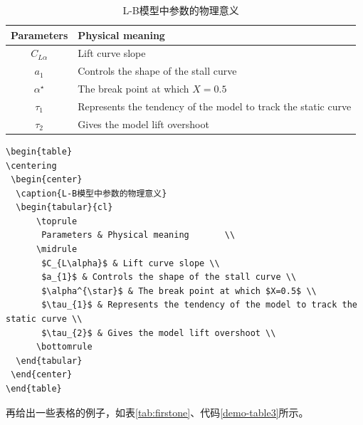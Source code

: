 \begin{table}              %
\centering
 \begin{center}
  \caption{L-B模型中参数的物理意义}
  \label{tab:LB-parameters}
  \begin{tabular}{cl}
      \toprule
       Parameters & Physical meaning       \\
      \midrule   %
       $C_{L\alpha}$ & Lift curve slope \\
       $a_{1}$ & Controls the shape of the stall curve \\
       $\alpha^{\star}$ & The break point at which $X=0.5$ \\
       $\tau_{1}$ & Represents the tendency of the model to track the static curve \\
       $\tau_{2}$ & Gives the model lift overshoot \\
      \bottomrule
  \end{tabular}
 \end{center}
\end{table}

\begin{lstlisting}[language={[LaTeX]TeX}, caption={插入表格\ref{tab:LB-parameters}}, label=demo-table2]
\begin{table}
\centering
 \begin{center}
  \caption{L-B模型中参数的物理意义}
  \begin{tabular}{cl}
      \toprule
       Parameters & Physical meaning       \\
      \midrule 
       $C_{L\alpha}$ & Lift curve slope \\
       $a_{1}$ & Controls the shape of the stall curve \\
       $\alpha^{\star}$ & The break point at which $X=0.5$ \\
       $\tau_{1}$ & Represents the tendency of the model to track the static curve \\
       $\tau_{2}$ & Gives the model lift overshoot \\
      \bottomrule
  \end{tabular}
 \end{center}
\end{table}
\end{lstlisting}

再给出一些表格的例子，如表\ref{tab:firstone}、代码\ref{demo-table3}所示。

